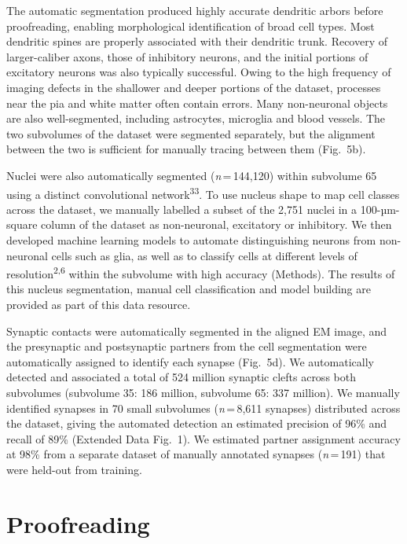 \documentclass{article}
\begin{document}
The automatic segmentation produced highly accurate dendritic arbors before proofreading, enabling morphological identification of broad cell types. Most dendritic spines are properly associated with their dendritic trunk. Recovery of larger-caliber axons, those of inhibitory neurons, and the initial portions of excitatory neurons was also typically successful. Owing to the high frequency of imaging defects in the shallower and deeper portions of the dataset, processes near the pia and white matter often contain errors. Many non-neuronal objects are also well-segmented, including astrocytes, microglia and blood vessels. The two subvolumes of the dataset were segmented separately, but the alignment between the two is sufficient for manually tracing between them (Fig.~5b).

Nuclei were also automatically segmented (\emph{n}\,=\,144,120) within subvolume 65 using a distinct convolutional network\textsuperscript{33}. To use nucleus shape to map cell classes across the dataset, we manually labelled a subset of the 2,751 nuclei in a 100-µm-square column of the dataset as non-neuronal, excitatory or inhibitory. We then developed machine learning models to automate distinguishing neurons from non-neuronal cells such as glia, as well as to classify cells at different levels of resolution\textsuperscript{2,6} within the subvolume with high accuracy (Methods). The results of this nucleus segmentation, manual cell classification and model building are provided as part of this data resource.

Synaptic contacts were automatically segmented in the aligned EM image, and the presynaptic and postsynaptic partners from the cell segmentation were automatically assigned to identify each synapse (Fig.~5d). We automatically detected and associated a total of 524 million synaptic clefts across both subvolumes (subvolume 35: 186 million, subvolume 65: 337 million). We manually identified synapses in 70 small subvolumes (\emph{n}\,=\,8,611 synapses) distributed across the dataset, giving the automated detection an estimated precision of 96\% and recall of 89\% (Extended Data Fig.~1). We estimated partner assignment accuracy at 98\% from a separate dataset of manually annotated synapses (\emph{n}\,=\,191) that were held-out from training.

\section*{Proofreading}
\end{document}
